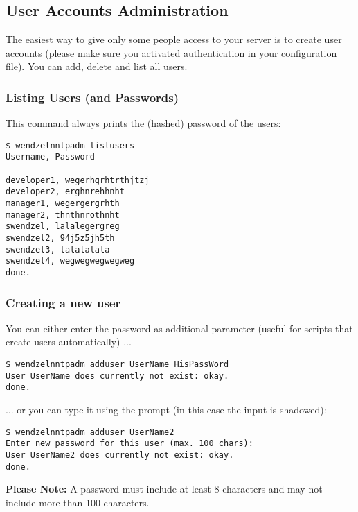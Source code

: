 \documentclass[12pt,fleqn,leqno]{scrbook}
\begin{document}
\hypertarget{user-accounts-administration-1}{%
\subsection{User Accounts
Administration}\label{user-accounts-administration-1}}

The easiest way to give only some people access to your server is to
create user accounts (please make sure you activated authentication in
your configuration file). You can add, delete and list all users.

\hypertarget{listing-users-and-passwords-1}{%
\subsubsection{Listing Users (and
Passwords)}\label{listing-users-and-passwords-1}}

This command always prints the (hashed) password of the users:

\begin{verbatim}
$ wendzelnntpadm listusers
Username, Password
------------------
developer1, wegerhgrhtrthjtzj
developer2, erghnrehhnht
manager1, wegergergrhth
manager2, thnthnrothnht
swendzel, lalalegergreg
swendzel2, 94j5z5jh5th
swendzel3, lalalalala
swendzel4, wegwegwegwegweg
done.
\end{verbatim}

\hypertarget{creating-a-new-user-1}{%
\subsubsection{Creating a new user}\label{creating-a-new-user-1}}

You can either enter the password as additional parameter (useful for
scripts that create users automatically) ...

\begin{verbatim}
$ wendzelnntpadm adduser UserName HisPassWord
User UserName does currently not exist: okay.
done.
\end{verbatim}

... or you can type it using the prompt (in this case the input is
shadowed):

\begin{verbatim}
$ wendzelnntpadm adduser UserName2
Enter new password for this user (max. 100 chars):
User UserName2 does currently not exist: okay.
done.
\end{verbatim}

\textbf{Please Note:} A password must include at least 8 characters and
may not include more than 100 characters.
\end{document}
